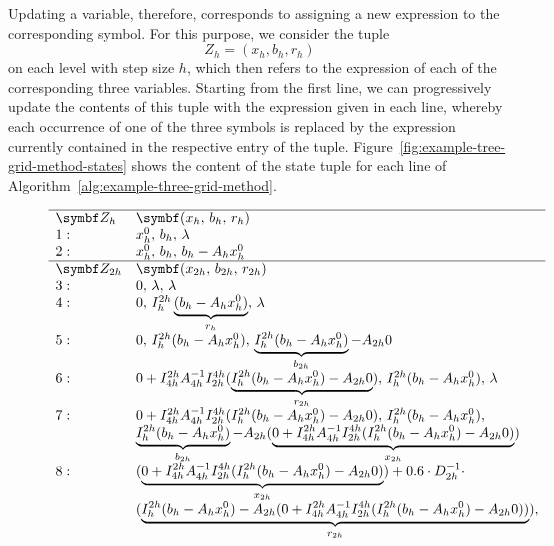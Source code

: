 Updating a variable, therefore, corresponds to assigning a new expression to the corresponding symbol.
For this purpose, we consider the tuple
\begin{equation*}
	Z_h = (x_h, b_h, r_h)
\end{equation*} 
on each level with step size $h$, which then refers to the expression of each of the corresponding three variables.
Starting from the first line, we can progressively update the contents of this tuple with the expression given in each line, whereby each occurrence of one of the three symbols is replaced by the expression currently contained in the respective entry of the tuple.
Figure~\ref{fig:example-tree-grid-method-states} shows the content of the state tuple for each line of Algorithm~\ref{alg:example-three-grid-method}.
\begin{figure}
	\begin{equation*}
		\begin{array}{l l}
			\hline
			\bm{Z_h} & \bm{(x_h, \, b_h, \, r_h)}  \\
			1: &  x_{h}^0, \, b_h, \, \lambda \\
			2: &  x_{h}^0, \, b_h, \, b_{h} - A_h x_{h}^0 \\ \hline
			\bm{Z_{2h}} &  \bm{(x_{2h}, \, b_{2h}, \, r_{2h})} \\
			3: &  0, \, \lambda, \, \lambda \\
			4: &  0, \, I_{h}^{2h}\underbrace{(b_{h} - A_h x_{h}^0)}_{r_{h}}, \, \lambda \\
			5: &  0, \, I_{h}^{2h}(b_{h} - A_h x_{h}^0), \,\underbrace{I_{h}^{2h}(b_{h} - A_h x_{h}^0)}_{b_{2h}} - A_{2h} 0 \\
			6: & 0 + I_{4h}^{2h} A_{4h}^{-1} I_{2h}^{4h} (\underbrace{I_{h}^{2h}(b_{h} - A_h x_{h}^0) - A_{2h} 0}_{r_{2h}}), \, I_{h}^{2h}(b_{h} - A_h x_{h}^0), \, \lambda\\
			7: & 0 + I_{4h}^{2h} A_{4h}^{-1} I_{2h}^{4h} (I_{h}^{2h}(b_{h} - A_h x_{h}^0) - A_{2h} 0), \, I_{h}^{2h}(b_{h} - A_h x_{h}^0), \\ 
			&  \underbrace{I_{h}^{2h}(b_{h} - A_h x_{h}^0)}_{b_{2h}} - A_{2h} (\underbrace{0 + I_{4h}^{2h} A_{4h}^{-1} I_{2h}^{4h} (I_{h}^{2h}(b_{h} - A_h x_{h}^0) - A_{2h} 0)}_{x_{2h}}) \\
			8: &   (\underbrace{0 + I_{4h}^{2h} A_{4h}^{-1} I_{2h}^{4h} (I_{h}^{2h}(b_{h} - A_h x_{h}^0) - A_{2h} 0)}_{x_{2h}}) + 0.6 \cdot D_{2h}^{-1} \cdot \\ 
			& (\underbrace{I_{h}^{2h}(b_{h} - A_h x_{h}^0) - A_{2h} (0 + I_{4h}^{2h} A_{4h}^{-1} I_{2h}^{4h} (I_{h}^{2h}(b_{h} - A_h x_{h}^0) - A_{2h} 0))}_{r_{2h}}), \\ 

\end{array}
\end{equation*}
\end{figure}
